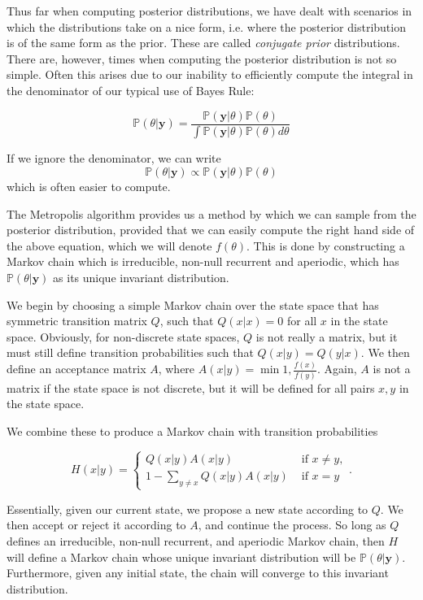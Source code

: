 

Thus far when computing posterior distributions, we have dealt with scenarios in which the distributions take on a nice form, i.e. where the posterior distribution is of the same form as the prior. These are called \emph{conjugate prior} distributions. There are, however, times when computing the posterior distribution is not so simple. Often this arises due to our inability to efficiently compute the integral in the denominator of our typical use of Bayes Rule:

$$\mathbb{P}(\theta | \mathbf{y}) = \frac{\mathbb{P}(\mathbf{y} | \theta) \mathbb{P}(\theta)}{\int \mathbb{P}(\mathbf{y} | \theta)\mathbb{P}(\theta) d\theta}$$

If we ignore the denominator, we can write $$\mathbb{P}(\theta | \mathbf{y}) \propto \mathbb{P}(\mathbf{y} | \theta) \mathbb{P}(\theta)$$
which is often easier to compute.

The Metropolis algorithm provides us a method by which we can sample from the posterior distribution, provided that we can easily compute the right hand side of the above equation, which we will denote $f(\theta)$. This is done by constructing a Markov chain which is irreducible, non-null recurrent and aperiodic, which has $\mathbb{P}(\theta | \mathbf{y})$ as its unique invariant distribution.

We begin by choosing a simple Markov chain over the state space that has symmetric transition matrix $Q$, such that $Q(x | x) = 0$ for all $x$ in the state space. Obviously, for non-discrete state spaces, $Q$ is not really a matrix, but it must still define transition probabilities such that $Q(x | y) = Q(y | x)$. We then define an acceptance matrix $A$, where $A(x | y) = \min{1,\frac{f(x)}{f(y)}}$. Again, $A$ is not a matrix if the state space is not discrete, but it will be defined for all pairs $x,y$ in the state space.

We combine these to produce a Markov chain with transition probabilities

$$H(x | y) = \begin{cases} Q(x | y)A(x | y) & \mbox{ if } x \neq y, \\ 1 - \sum_{y \neq x} Q(x | y)A(x | y) & \mbox{ if } x = y \end{cases}.$$

Essentially, given our current state, we propose a new state according to $Q$. We then accept or reject it according to $A$, and continue the process. So long as $Q$ defines an irreducible, non-null recurrent, and aperiodic Markov chain, then $H$ will define a Markov chain whose unique invariant distribution will be $\mathbb{P}(\theta | \mathbf{y})$. Furthermore, given any initial state, the chain will converge to this invariant distribution.

